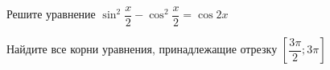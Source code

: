 \begin{ex}
	\begin{condition}
		\begin{enumcols}[label=\asbuk*)]
			\item Решите уравнение \( \sin^2 {\dfrac{x}{2}} - \cos^2 {\dfrac{x}{2}} =\cos 2x  \)
			\item Найдите все корни уравнения, принадлежащие отрезку \(  \left[\dfrac{3\pi}{2};3\pi\right]  \)
		\end{enumcols}
	\end{condition}
\end{ex}
